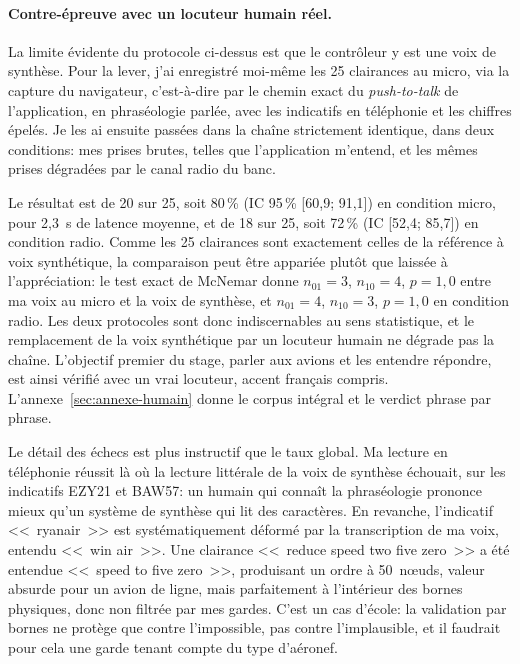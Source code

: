 \documentclass[11pt,a4paper]{article}
\begin{document}
\paragraph{Contre-épreuve avec un locuteur humain réel.} La limite évidente du protocole ci-dessus est que le contrôleur y est une voix de synthèse. Pour la lever, j'ai enregistré moi-même les 25 clairances au micro, via la capture du navigateur, c'est-à-dire par le chemin exact du \emph{push-to-talk} de l'application, en phraséologie parlée, avec les indicatifs en téléphonie et les chiffres épelés. Je les ai ensuite passées dans la chaîne strictement identique, dans deux conditions: mes prises brutes, telles que l'application m'entend, et les mêmes prises dégradées par le canal radio du banc. 

Le résultat est de 20 sur 25, soit 80\,\% (IC 95\,\% [60,9; 91,1]) en condition micro, pour 2,3~s de latence moyenne, et de 18 sur 25, soit 72\,\% (IC [52,4; 85,7]) en condition radio. Comme les 25 clairances sont exactement celles de la référence à voix synthétique, la comparaison peut être appariée plutôt que laissée à l'appréciation: le test exact de McNemar donne $n_{01} = 3$, $n_{10} = 4$, $p = 1{,}0$ entre ma voix au micro et la voix de synthèse, et $n_{01} = 4$, $n_{10} = 3$, $p = 1{,}0$ en condition radio. Les deux protocoles sont donc indiscernables au sens statistique, et le remplacement de la voix synthétique par un locuteur humain ne dégrade pas la chaîne. L'objectif premier du stage, parler aux avions et les entendre répondre, est ainsi vérifié avec un vrai locuteur, accent français compris. L'annexe~\ref{sec:annexe-humain} donne le corpus intégral et le verdict phrase par phrase.

Le détail des échecs est plus instructif que le taux global. Ma lecture en téléphonie réussit là où la lecture littérale de la voix de synthèse échouait, sur les indicatifs EZY21 et BAW57: un humain qui connaît la phraséologie prononce mieux qu'un système de synthèse qui lit des caractères. En revanche, l'indicatif <<~ryanair~>> est systématiquement déformé par la transcription de ma voix, entendu <<~win air~>>. Une clairance <<~reduce speed two five zero~>> a été entendue <<~speed to five zero~>>, produisant un ordre à 50~n\oe uds, valeur absurde pour un avion de ligne, mais parfaitement à l'intérieur des bornes physiques, donc non filtrée par mes gardes. C'est un cas d'école: la validation par bornes ne protège que contre l'impossible, pas contre l'implausible, et il faudrait pour cela une garde tenant compte du type d'aéronef. 
\end{document}
